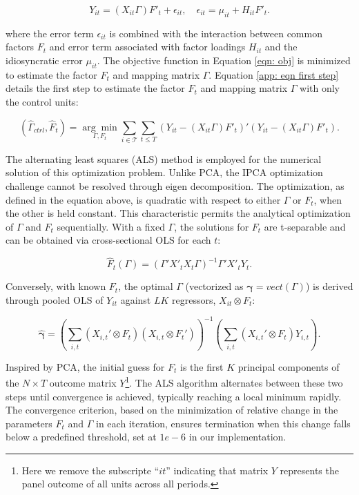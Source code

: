 \documentclass[12pt]{article}
\begin{document}
\begin{equation}
\label{app: eqn combined}
Y_{it} = (X_{it}\Gamma) F'_{t} + \epsilon_{it}, \quad \epsilon_{it} = \mu_{it} + H_{it} F'_t.
\end{equation}

where the error term $\epsilon_{it}$ is combined with the interaction between common factors $F_t$ and error term associated with factor loadings $H_{it}$ and the idiosyncratic error $\mu_{it}$. The objective function in Equation \ref{eqn: obj} is minimized to estimate the factor $F_t$ and mapping matrix $\Gamma$. Equation \ref{app: eqn first step} details the first step to estimate the factor $F_t$ and mapping matrix $\Gamma$ with only the control units:

\begin{equation}
\label{app: eqn first step}
(\hat{\Gamma}_{ctrl}, \hat{F}_t) = \underset{\Gamma, F_t}{\arg\min} \sum_{i \in \mathcal{T}} \sum_{t \leq T} \left( Y_{it} - (X_{it}\Gamma) F'_{t} \right)' \left( Y_{it} - (X_{it}\Gamma) F'_{t} \right).
\end{equation}

The alternating least squares (ALS) method is employed for the numerical solution of this optimization problem. Unlike PCA, the IPCA optimization challenge cannot be resolved through eigen decomposition. The optimization, as defined in the equation above, is quadratic with respect to either $\Gamma$ or $F_t$, when the other is held constant. This characteristic permits the analytical optimization of $\Gamma$ and $F_t$ sequentially. With a fixed $\Gamma$, the solutions for $F_t$ are t-separable and can be obtained via cross-sectional OLS for each $t$:

\begin{equation}
\label{app: eqn update f}
\hat{F}_t(\Gamma) = (\Gamma' X'_t X_t \Gamma)^{-1} \Gamma' X'_t Y_t.
\end{equation}

Conversely, with known $F_{t}$, the optimal $\Gamma$ (vectorized as $\bm{\gamma} = vect(\Gamma)$) is derived through pooled OLS of $Y_{it}$ against $LK$ regressors, $X_{it} \otimes F_t$:

\begin{equation}
\label{app: eqn update gamma}
\hat{\bm{\gamma}} = \left( \sum_{i,t} (X_{i,t}' \otimes F_t) (X_{i,t} \otimes F_t') \right)^{-1} \left( \sum_{i,t} (X_{i,t}' \otimes F_t) Y_{i,t} \right).
\end{equation}

Inspired by PCA, the initial guess for $F_t$ is the first $K$ principal components of the $N \times T$ outcome matrix $Y$\footnote{Here we remove the subscripte ``$it$'' indicating that matrix $Y$ represents the panel outcome of all units across all periods.}. The ALS algorithm alternates between these two steps until convergence is achieved, typically reaching a local minimum rapidly. The convergence criterion, based on the minimization of relative change in the parameters $F_t$ and $\Gamma$ in each iteration, ensures termination when this change falls below a predefined threshold, set at $1e-6$ in our implementation.
\end{document}
